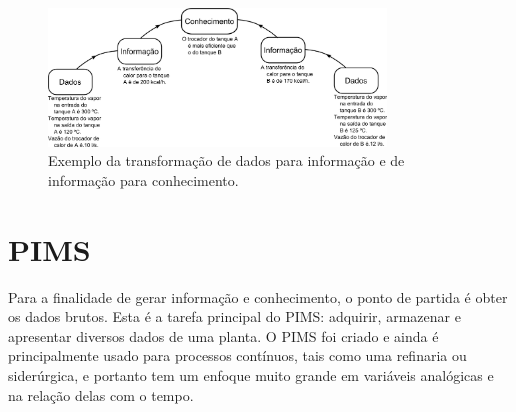 \begin{figure}[htb]
	\begin{center}
		\includegraphics[angle=-90,width=0.8\textwidth]{PIMS_conhecimento2}
	\end{center}
	\caption{Exemplo da transformação de dados para informação e de informação para conhecimento.}
	\label{fig:PIMS_conhecimento2}
\end{figure}

\section{PIMS}
	Para a finalidade de gerar informação e conhecimento, o ponto de partida é obter os dados brutos. Esta é a tarefa principal do PIMS: adquirir, armazenar e apresentar diversos dados de uma planta. O PIMS foi criado e ainda é principalmente usado para processos contínuos, tais como uma refinaria ou siderúrgica, e portanto tem um enfoque muito grande em variáveis analógicas e na relação delas com o tempo.


